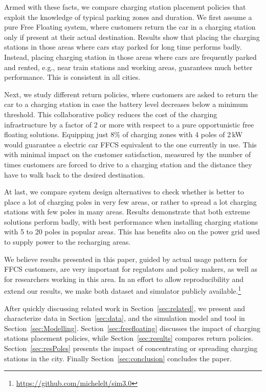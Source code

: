 Armed with these facts, we compare charging station placement policies that exploit the knowledge of typical parking zones and duration. We first assume a pure Free Floating system, where customers return the car in a charging station only if present at their actual destination.
Results show that placing the charging stations in those areas where cars stay parked for long time performs badly. Instead, placing charging station in those areas where cars are frequently parked and rented, e.g., near train stations and working areas, guarantees much better performance. This is consistent in all cities.

Next, we study different return policies, where customers are asked to return the car to a charging station in case the battery level decreases below a minimum threshold. This collaborative policy reduces the cost of the charging infrastructure by a factor of 2 or more with respect to a pure opportunistic free floating solutions. Equipping just 8\% of charging zones with 4 poles of 2\,kW would guarantee a electric car FFCS equivalent to the one currently in use.
This with minimal impact on the customer satisfaction, measured by the number of times customers are forced to drive to a charging station and the distance they have to walk back to the desired destination.

At last, we compare system design alternatives to check whether is better to place a lot of charging poles in very few areas, or rather to spread a lot charging stations with few poles in many areas. Results demonstrate that both extreme solutions perform badly, with best performance when installing charging stations with  5 to 20 poles in popular areas. This has benefits also on the power grid used to supply power to the recharging areas.

We believe results presented in this paper, guided by actual usage pattern for FFCS customers, are very important for regulators and policy makers, as well as for researchers working in this area. In an effort to allow reproducibility and extend our results, we make both dataset and simulator publicly available.\footnote{\url{https://github.com/michelelt/sim3.0}}

After quickly discussing related work in Section~\ref{sec:related}, we present and characterize data in Section~\ref{sec:data}, and the simulation model and tool in Section~\ref{sec:Modelling}. Section~\ref{sec:freefloating} discusses the impact of charging stations placement policies, while Section~\ref{sec:results} compares return policies. Section~\ref{sec:resPoles} presents the impact of concentrating or spreading charging stations in the city. Finally Section~\ref{sec:conclusion} concludes the paper.
